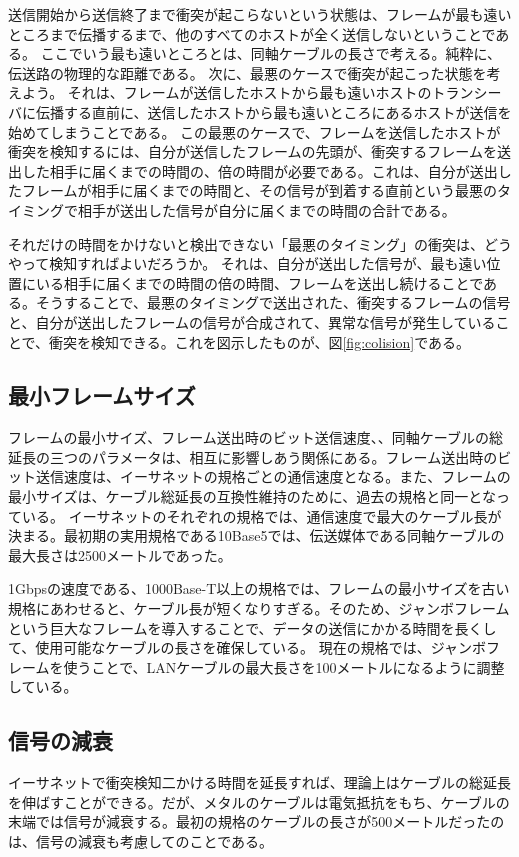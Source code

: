送信開始から送信終了まで衝突が起こらないという状態は、フレームが最も遠いところまで伝播するまで、他のすべてのホストが全く送信しないということである。
ここでいう最も遠いところとは、同軸ケーブルの長さで考える。純粋に、伝送路の物理的な距離である。
次に、最悪のケースで衝突が起こった状態を考えよう。
それは、フレームが送信したホストから最も遠いホストのトランシーバに伝播する直前に、送信したホストから最も遠いところにあるホストが送信を始めてしまうことである。
この最悪のケースで、フレームを送信したホストが衝突を検知するには、自分が送信したフレームの先頭が、衝突するフレームを送出した相手に届くまでの時間の、倍の時間が必要である。これは、自分が送出したフレームが相手に届くまでの時間と、その信号が到着する直前という最悪のタイミングで相手が送出した信号が自分に届くまでの時間の合計である。

それだけの時間をかけないと検出できない「最悪のタイミング」の衝突は、どうやって検知すればよいだろうか。
それは、自分が送出した信号が、最も遠い位置にいる相手に届くまでの時間の倍の時間、フレームを送出し続けることである。そうすることで、最悪のタイミングで送出された、衝突するフレームの信号と、自分が送出したフレームの信号が合成されて、異常な信号が発生していることで、衝突を検知できる。これを図示したものが、図\ref{fig:colision}である。

\subsection{最小フレームサイズ}

フレームの最小サイズ、フレーム送出時のビット送信速度、、同軸ケーブルの総延長の三つのパラメータは、相互に影響しあう関係にある。フレーム送出時のビット送信速度は、イーサネットの規格ごとの通信速度となる。また、フレームの最小サイズは、ケーブル総延長の互換性維持のために、過去の規格と同一となっている。
イーサネットのそれぞれの規格では、通信速度で最大のケーブル長が決まる。最初期の実用規格である10Base5では、伝送媒体である同軸ケーブルの最大長さは2500メートルであった。

1Gbpsの速度である、1000Base-T以上の規格では、フレームの最小サイズを古い規格にあわせると、ケーブル長が短くなりすぎる。そのため、ジャンボフレームという巨大なフレームを導入することで、データの送信にかかる時間を長くして、使用可能なケーブルの長さを確保している。
現在の規格では、ジャンボフレームを使うことで、LANケーブルの最大長さを100メートルになるように調整している。

\subsection{信号の減衰}
イーサネットで衝突検知二かける時間を延長すれば、理論上はケーブルの総延長を伸ばすことができる。だが、メタルのケーブルは電気抵抗をもち、ケーブルの末端では信号が減衰する。最初の規格のケーブルの長さが500メートルだったのは、信号の減衰も考慮してのことである。

